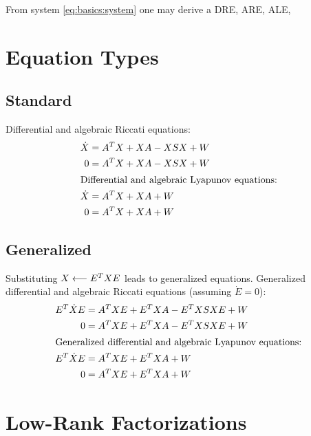 From system \eqref{eq:basics:system} one may derive a \ac{DRE}, \ac{ARE}, \ac{ALE}, \etc

\section{Equation Types}
\subsection{Standard}

Differential and algebraic Riccati equations:
\begin{align}
  \dot{X} &= A^T X + XA - XSX + W \\
  0 &= A^T X + XA - XSX + W \\
\intertext{Differential and algebraic Lyapunov equations:}
  \dot{X} &= A^T X + XA + W \\
  0 &= A^T X + XA + W
\end{align}

\subsection{Generalized}

Substituting $X\longleftarrow E^T XE$ leads to generalized equations.
Generalized differential and algebraic Riccati equations (assuming $\dot E = 0$):
\begin{align}
  E^T \dot{X}E &= A^T XE + E^T XA - E^T XSXE + W \\
  0 &= A^T XE + E^T XA - E^T XSXE + W \\
\intertext{Generalized differential and algebraic Lyapunov equations:}
  E^T \dot{X}E &= A^T XE + E^T XA + W \\
  0 &= A^T XE + E^T XA + W \\
\end{align}

\cite{Lang2017}

\section{Low-Rank Factorizations}

